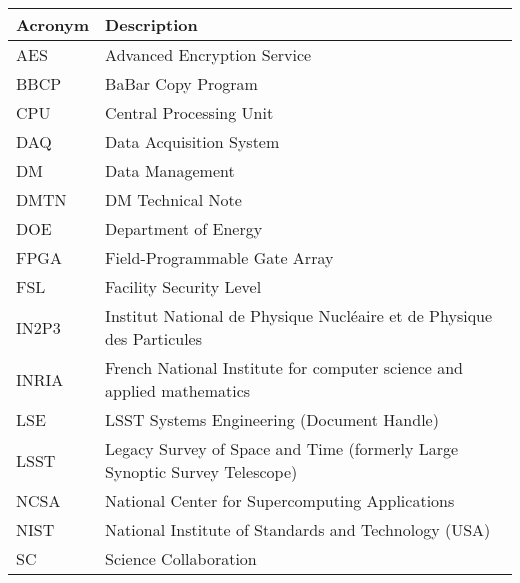 \addtocounter{table}{-1}
\begin{longtable}{p{}p{}}\hline
\textbf{Acronym} & \textbf{Description}  \\\hline

AES & Advanced Encryption Service \\\hline
BBCP & BaBar Copy Program \\\hline
CPU & Central Processing Unit \\\hline
DAQ & Data Acquisition System \\\hline
DM & Data Management \\\hline
DMTN & DM Technical Note \\\hline
DOE & Department of Energy \\\hline
FPGA & Field-Programmable Gate Array \\\hline
FSL & Facility Security Level \\\hline
IN2P3 & Institut National de Physique Nucléaire et de Physique des Particules \\\hline
INRIA & French National Institute for computer science and applied mathematics \\\hline
LSE & LSST Systems Engineering (Document Handle) \\\hline
LSST & Legacy Survey of Space and Time (formerly Large Synoptic Survey Telescope) \\\hline
NCSA & National Center for Supercomputing Applications \\\hline
NIST & National Institute of Standards and Technology (USA) \\\hline
SC & Science Collaboration \\\hline
\end{longtable}
